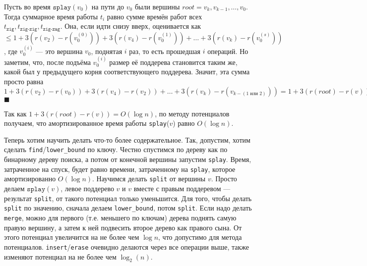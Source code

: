 Пусть во время $\texttt{splay}(v_0)$ на пути до $v_0$ были вершины $root = v_k, v_{k - 1}, \ldots, v_0$. Тогда суммарное время работы $t_i$ равно сумме времён работ всех $t_\texttt{zig}, t_\texttt{zig-zig}, t_\texttt{zig-zag}$. Она, если идти снизу вверх, оценивается как $\leq 1 + 3(r(v_2) - r(v^{(0)}_0)) + 3(r(v_4) - r(v^{(1)}_0)) + \ldots + 3(r(v_k) - r(v^{(s)}_0))$, где $v^{(i)}_0$ --- это вершина $v_0$, поднятая $i$ раз, то есть прошедшая $i$ операций. Но заметим, что, после подъёма $v^{(i)}_0$ размер её поддерева становится таким же, какой был у предыдущего корня соответствующего поддерева. Значит, эта сумма просто равна $1 + 3(r(v_2) - r(v_0)) + 3(r(v_4) - r(v_2)) + \ldots + 3(r(v_k) - r(v_{k - (\text{1 или 2})})) = 1 + 3(r(root) - r(v))$ $\blacksquare$

\bigskip

Так как $1 + 3(r(root) - r(v)) = O(\log n)$, по методу потенциалов получаем, что амортизированное время работы \texttt{splay}($v$) равно $O(\log n)$.

Теперь хотим научить делать что-то более содержательное. Так, допустим, хотим сделать \texttt{find}/\texttt{lower\_bound} по ключу. Честно спустимся по дереву как по бинарному дереву поиска, а потом от конечной вершины запустим \texttt{splay}. Время, затраченное на спуск, будет равно времени, затраченному на \texttt{splay}, которое амортизированно $O(\log n)$. Научимся делать \texttt{split} от вершины $v$. Просто делаем $\texttt{splay}(v)$, левое поддерево $v$ и $v$ вместе с правым поддеревом --- результат \texttt{split}, от такого потенциал только уменьшится. Для того, чтобы делать \texttt{split} по значению, сначала делаем \texttt{lower\_bound}, потом \texttt{split}. Если надо делать \texttt{merge}, можно для первого (т.е. меньшего по ключам) дерева поднять самую правую вершину, а затем к ней подвесить второе дерево как правого сына. От этого потенциал увеличится на не более чем $\log n$, что допустимо для метода потенциалов. \texttt{insert}/\texttt{erase} очевидно делаются через все операции выше, также изменяют потенциал на не более чем $\log_2(n)$.